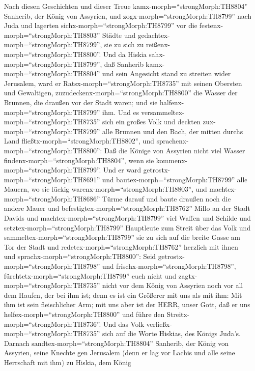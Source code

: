  Nach diesen Geschichten und dieser Treue
kamx-morph=``strongMorph:TH8804'' Sanherib, der König von Assyrien, und
zogx-morph=``strongMorph:TH8799'' nach Juda und lagerten
sichx-morph=``strongMorph:TH8799'' vor die
festenx-morph=``strongMorph:TH8803'' Städte und
gedachtex-morph=``strongMorph:TH8799'', sie zu sich zu
reißenx-morph=``strongMorph:TH8800''.  Und da Hiskia
sahx-morph=``strongMorph:TH8799'', daß Sanherib
kamx-morph=``strongMorph:TH8804'' und sein Angesicht stand zu streiten
wider Jerusalem,  ward er Ratsx-morph=``strongMorph:TH8735''
mit seinen Obersten und Gewaltigen,
zuzudeckenx-morph=``strongMorph:TH8800'' die Wasser der Brunnen, die
draußen vor der Stadt waren; und sie
halfenx-morph=``strongMorph:TH8799'' ihm.  Und es
versammeltex-morph=``strongMorph:TH8735'' sich ein großes Volk und
deckten zux-morph=``strongMorph:TH8799'' alle Brunnen und den Bach, der
mitten durchs Land fließtx-morph=``strongMorph:TH8802'', und
sprachenx-morph=``strongMorph:TH8800'': Daß die Könige von Assyrien
nicht viel Wasser findenx-morph=``strongMorph:TH8804'', wenn sie
kommenx-morph=``strongMorph:TH8799''.  Und er ward
getrostx-morph=``strongMorph:TH8691'' und
bautex-morph=``strongMorph:TH8799'' alle Mauern, wo sie lückig
warenx-morph=``strongMorph:TH8803'', und
machtex-morph=``strongMorph:TH8686'' Türme darauf und baute draußen noch
die andere Mauer und befestigtex-morph=``strongMorph:TH8762'' Millo an
der Stadt Davids und machtex-morph=``strongMorph:TH8799'' viel Waffen
und Schilde  und setztex-morph=``strongMorph:TH8799''
Hauptleute zum Streit über das Volk und
sammeltex-morph=``strongMorph:TH8799'' sie zu sich auf die breite Gasse
am Tor der Stadt und redetex-morph=``strongMorph:TH8762'' herzlich mit
ihnen und sprachx-morph=``strongMorph:TH8800'':  Seid
getrostx-morph=``strongMorph:TH8798'' und
frischx-morph=``strongMorph:TH8798'',
fürchtetx-morph=``strongMorph:TH8799'' euch nicht und
zagtx-morph=``strongMorph:TH8735'' nicht vor dem König von Assyrien noch
vor all dem Haufen, der bei ihm ist; denn es ist ein Größerer mit uns
als mit ihm:  Mit ihm ist sein fleischlicher Arm; mit uns
aber ist der HERR, unser Gott, daß er uns
helfex-morph=``strongMorph:TH8800'' und führe den
Streitx-morph=``strongMorph:TH8736''. Und das Volk
verließx-morph=``strongMorph:TH8735'' sich auf die Worte Hiskias, des
Königs Juda's.  Darnach sandtex-morph=``strongMorph:TH8804''
Sanherib, der König von Assyrien, seine Knechte gen Jerusalem (denn er
lag vor Lachis und alle seine Herrschaft mit ihm) zu Hiskia, dem König
